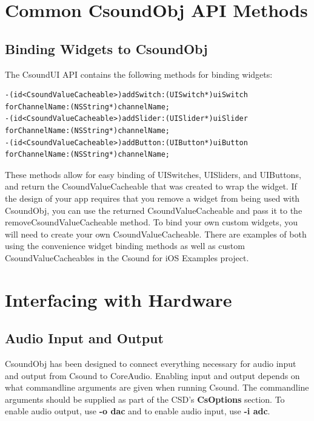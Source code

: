 \documentclass[11pt]{article}
\begin{document}

\section{Common CsoundObj API Methods}

\subsection{Binding Widgets to CsoundObj}

The CsoundUI API contains the following methods for binding widgets:

\begin{lstlisting}[caption=Methods for Widget Binding]
-(id<CsoundValueCacheable>)addSwitch:(UISwitch*)uiSwitch forChannelName:(NSString*)channelName;
-(id<CsoundValueCacheable>)addSlider:(UISlider*)uiSlider forChannelName:(NSString*)channelName;
-(id<CsoundValueCacheable>)addButton:(UIButton*)uiButton forChannelName:(NSString*)channelName; 
\end{lstlisting}

These methods allow for easy binding of UISwitches, UISliders, and UIButtons, and return the CsoundValueCacheable that was created to wrap the widget. If the design of your app requires that you remove a widget from being used with CsoundObj, you can use the returned CsoundValueCacheable and pass it to the removeCsoundValueCacheable method. To bind your own custom widgets, you will need to create your own CsoundValueCacheable.  There are examples of both using the convenience widget binding methods as well as custom CsoundValueCacheables in the Csound for iOS Examples project.


\section{Interfacing with Hardware}
\subsection{Audio Input and Output}

CsoundObj has been designed to connect everything necessary for audio input and output from Csound to CoreAudio.  Enabling input and output depends on what commandline arguments are given when running Csound.  The commandline arguments should be supplied as part of the CSD's \textbf{CsOptions} section.  To enable audio output, use \textbf{-o dac} and to enable audio input, use \textbf{-i adc}. 
\end{document}
